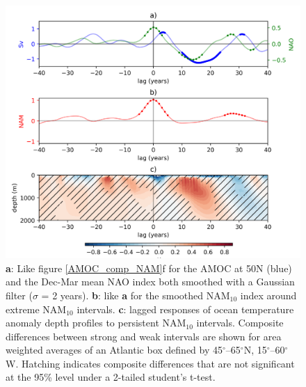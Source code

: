 \begin{figure}[h!]
\begin{center}
\noindent\includegraphics[width = \linewidth]{Figures/Figures-surface/Ocean_T_AMOC_NAO_responses.png} 
\caption{\textbf{a}: Like figure \ref{AMOC_comp_NAM}f for the AMOC at 50N (blue) and the Dec-Mar mean NAO index both smoothed with a Gaussian filter ($\sigma$ = 2 years). \textbf{b}: like \textbf{a} for the smoothed NAM$_{10}$ index around extreme NAM$_{10}$ intervals. \textbf{c}: lagged responses of ocean temperature anomaly depth profiles to persistent NAM$_{10}$ intervals. Composite differences between strong and weak intervals are shown for area weighted averages of an Atlantic box defined by 45$^{\circ}$–65$^{\circ}$N, 15$^{\circ}$–60$^{\circ}$W. Hatching indicates composite differences that are not significant at the 95\% level under a 2-tailed student's t-test.}
\label{NAO_AMOC_T_response}
\end{center}
\end{figure}

